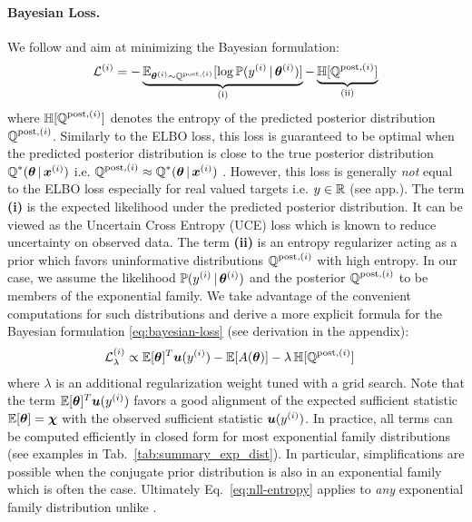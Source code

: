\paragraph{Bayesian Loss.} We follow \cite{charpentier2020} and aim at minimizing the Bayesian formulation:
%
\begin{equation}\label{eq:bayesian-loss}
    \mathcal{L}^{(i)} = - \underbrace{\operatorname{\mathbb{E}}_{\bm{\theta}^{(i)} \sim \operatorname{\mathbb{Q}}^{\text{post},(i)}}[\log \operatorname{\mathbb{P}}(y^{(i)}\,|\, \bm{\theta} ^{(i)})]}_\text{(i)} - \underbrace{\operatorname{\mathbb{H}}[\operatorname{\mathbb{Q}}^{\text{post},(i)}]}_\text{(ii)}
\end{equation}
%
where $\operatorname{\mathbb{H}}[\operatorname{\mathbb{Q}}^{\text{post},(i)}]$ denotes the entropy of the predicted posterior distribution $\operatorname{\mathbb{Q}}^{\text{post},(i)}$. Similarly to the ELBO loss, this loss is guaranteed to be optimal when the predicted posterior distribution is close to the true posterior distribution $\operatorname{\mathbb{Q}}^*(\bm{\theta} \,|\, \bm{x}^{(i)})$ i.e. $\operatorname{\mathbb{Q}}^{\text{post},(i)} \approx \operatorname{\mathbb{Q}}^*(\bm{\theta} \,|\, \bm{x}^{(i)})$ \citep{update-belief-propagation, PAC-bayesian_estimator, opt-info-processing_bayes}. However, this loss is generally \emph{not} equal to the ELBO loss especially for real valued targets i.e. $y \in \operatorname{\mathbb{R}}$ (see app.). The term \textbf{(i)} is the expected likelihood under the predicted posterior distribution. It can be viewed as the Uncertain Cross Entropy (UCE) loss \citep{uceloss} which is known to reduce uncertainty on observed data. The term \textbf{(ii)} is an entropy regularizer acting as a prior which favors uninformative distributions $\operatorname{\mathbb{Q}}^{\text{post},(i)}$ with high entropy. In our case, we assume the likelihood $\operatorname{\mathbb{P}}(y^{(i)}\,|\,\bm{\theta}^{(i)})$ and the posterior $\operatorname{\mathbb{Q}}^{\text{post},(i)}$ to be members of the exponential family. We take advantage of the convenient computations for such distributions and derive a more explicit formula for the Bayesian formulation \eqref{eq:bayesian-loss} (see derivation in the appendix):
%
\begin{equation}\label{eq:nll-entropy}
    \begin{aligned}
    \mathcal{L}_\lambda^{(i)} &\propto \operatorname{\mathbb{E}}[\bm{\theta}]^T \bm{u}(y^{(i)}) - \operatorname{\mathbb{E}}[A(\bm{\bm{\theta}})] - \lambda\operatorname{\mathbb{H}}[\operatorname{\mathbb{Q}}^{\text{post},(i)}]
    \end{aligned}
\end{equation}
%
where $\lambda$ is an additional regularization weight tuned with a grid search. Note that the term $\operatorname{\mathbb{E}}[\bm{\theta}]^T \bm{u}(y^{(i)}) $ favors a good alignment of the expected sufficient statistic $\operatorname{\mathbb{E}}[\bm{\theta}] = \bm{\chi}$ with the observed sufficient statistic $\bm{u}(y^{(i)})$. In practice, all terms can be computed efficiently in closed form for most exponential family distributions (see examples in Tab.~\ref{tab:summary_exp_dist}). In particular, simplifications are possible when the conjugate prior distribution is also in an exponential family which is often the case. Ultimately Eq.~\eqref{eq:nll-entropy} applies to \emph{any} exponential family distribution unlike \cite{charpentier2020}.

